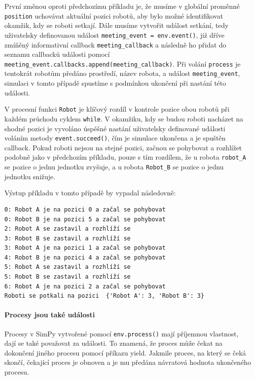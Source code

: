\documentclass[
  program=itp,
  biblatex,
  figures=false,
  glossaries,
  index
]{kidiplom}
\begin{document}
První změnou oproti předchozímu příkladu je, že musíme v globální proměnné \texttt{position} uchovávat aktuální pozici robotů, aby bylo možné identifikovat okamžik, kdy se roboti setkají. Dále musíme vytvořit událost setkání, tedy uživatelsky definovanou událost \texttt{meeting\_event = env.event()}, již dříve zmíňěný informativní callback \texttt{meeting\_callback} a následně ho přidat do seznamu callbacků události pomocí \texttt{meeting\_event.callbacks.append(meeting\_callback)}. Při volání \texttt{process} je tentokrát robotům předáno prostředí, název robota, a událost \texttt{meeting\_event}, simulaci v tomto případě spustíme s podmínkou ukončení při nastání této události.

V procesní funkci \texttt{Robot} je klíčový rozdíl v kontrole pozice obou robotů při každém průchodu  cyklem \texttt{while}. V okamžiku, kdy se budou roboti nacházet na shodné pozici je vyvoláno úspěšné nastání uživatelsky definované události voláním metody \texttt{event.succeed()}, čím je simulace ukončena a je spuštěn callback. Pokud roboti nejsou na stejné pozici, začnou se pohybovat a rozhlížet podobně jako v předchozím příkladu, pouze s tím rozdílem, že u robota \texttt{robot\_A} se pozice o jednu jednotku zvyšuje, a u robota \texttt{Robot\_B} se pozice o jednu jednotku snižuje.

\noindent Výstup příkladu v tomto případě by vypadal následovně:

\begin{verbatim}
0: Robot A je na pozici 0 a začal se pohybovat
0: Robot B je na pozici 5 a začal se pohybovat
2: Robot A se zastavil a rozhlíží se
3: Robot B se zastavil a rozhlíží se
3: Robot A je na pozici 1 a začal se pohybovat
4: Robot B je na pozici 4 a začal se pohybovat
5: Robot A se zastavil a rozhlíží se
5: Robot B se zastavil a rozhlíží se
6: Robot A je na pozici 2 a začal se pohybovat
Roboti se potkali na pozici  {'Robot A': 3, 'Robot B': 3}
\end{verbatim}

\paragraph{Procesy jsou také události}
Procesy v SimPy vytvořené pomocí \texttt{env.process()} mají příjemnou vlastnost, dají se také považovat za události. To znamená, že proces může čekat na dokončení jiného procesu pomocí příkazu yield. Jakmile proces, na který se čeká skončí, čekající proces je obnoven a je mu předána návratová hodnota ukončeného procesu.
\end{document}
